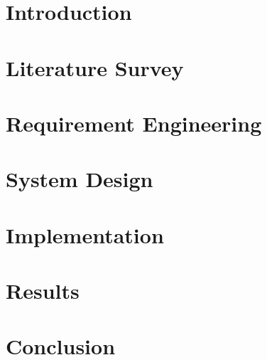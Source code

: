 \documentclass[a4paper, 11pt, oneside]{report}
\begin{document}
\chapter{Introduction}


\chapter{Literature Survey}


\chapter{Requirement Engineering}


\chapter{System Design}


\chapter{Implementation}


\chapter{Results}


\chapter{Conclusion}





\end{document}
